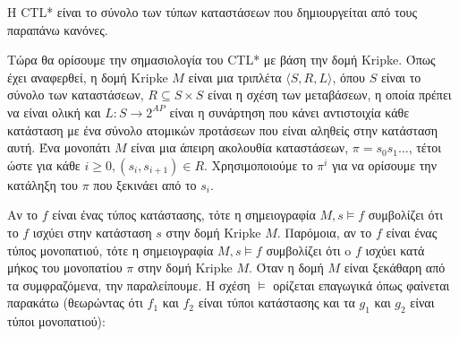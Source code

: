 \documentclass{article}
\newcommand{\english}[1]{\foreignlanguage{english}{{#1}}}
\begin{document}
H \english{CTL*} είναι το σύνολο των τύπων καταστάσεων που δημιουργείται από τους παραπάνω κανόνες.

Τώρα θα ορίσουμε την σημασιολογία του \english{CTL*} με βάση την δομή \english{Kripke}. Όπως έχει αναφερθεί, η δομή \english{Kripke} $M$ είναι μια τριπλέτα $\langle S, R, L \rangle$, όπου $S$ είναι το σύνολο των καταστάσεων, $R \subseteq S \times S$ είναι η σχέση των μεταβάσεων, η οποία πρέπει να είναι ολική και $L : S \rightarrow2^{AP}$ είναι η συνάρτηση που κάνει αντιστοιχία κάθε κατάσταση με ένα σύνολο ατομικών προτάσεων που είναι αληθείς στην κατάσταση αυτή. Ένα μονοπάτι $M$ είναι μια άπειρη ακολουθία καταστάσεων, $π = s_0s_1 \ldots$, τέτοι ώστε για κάθε $i \geq 0, (s_i, s_{i+1}) \in R$. Χρησιμοποιούμε το $π^i$ για να ορίσουμε την κατάληξη του $π$ που ξεκινάει από το $s_i$. 

Αν το $f$ είναι ένας τύπος κατάστασης, τότε η σημειογραφία $M, s \models f$ συμβολίζει ότι το $f$ ισχύει στην κατάσταση $s$ στην δομή \english{Kripke} $M$. Παρόμοια, αν το $f$ είναι ένας τύπος μονοπατιού, τότε η σημειογραφία $M, s \models f$ συμβολίζει ότι o $f$ ισχύει κατά μήκος του μονοπατίου $π$ στην δομή  \english{Kripke} $M$. Όταν η δομή $M$ είναι ξεκάθαρη από τα συμφραζόμενα, την παραλείπουμε. Η σχέση $\models$ ορίζεται επαγωγικά όπως φαίνεται παρακάτω (θεωρώντας ότι $f_1$ και $f_2$ είναι τύποι κατάστασης και τα $g_1$ και $g_2$ είναι τύποι μονοπατιού):
\end{document}
